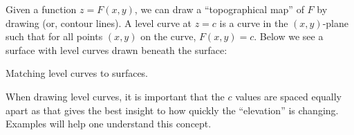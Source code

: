 \documentclass{ximera}
\begin{document}
Given a function $z=F(x,y)$, we can draw a ``topographical map'' of
$F$ by drawing  (or, contour lines). A level curve
at $z=c$ is a curve in the $(x,y)$-plane such that for all points
$(x,y)$ on the curve, $F(x,y) = c$. Below we see a surface with level
curves drawn beneath the surface:

\begin{image}
\end{image}

\begin{question}
  Matching level curves to surfaces.
\end{question}


When drawing level curves, it is important that the $c$ values are
spaced equally apart as that gives the best insight to how quickly the
``elevation'' is changing. Examples will help one understand this
concept.
\end{document}
